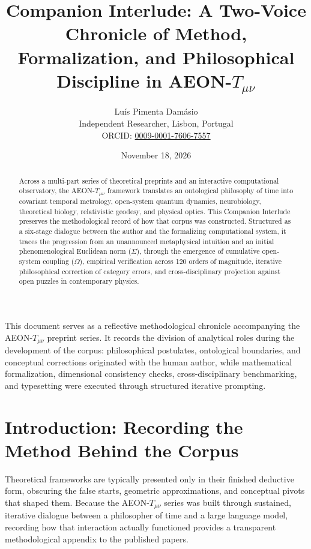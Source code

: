 \documentclass[11pt,a4paper]{article}
\title{\textbf{Companion Interlude: A Two-Voice Chronicle of Method, Formalization, and Philosophical Discipline in AEON-$T_{\mu\nu}$}}
\author{Lu\'is Pimenta Dam\'asio\\
\small Independent Researcher, Lisbon, Portugal\\
\small ORCID: \href{https://orcid.org/0009-0001-7606-7557}{0009-0001-7606-7557}}
\date{November 18, 2026}
\begin{document}
\maketitle

\begin{abstract}
Across a multi-part series of theoretical preprints and an interactive computational observatory, the AEON-$T_{\mu\nu}$ framework translates an ontological philosophy of time into covariant temporal metrology, open-system quantum dynamics, neurobiology, theoretical biology, relativistic geodesy, and physical optics. This Companion Interlude preserves the methodological record of how that corpus was constructed. Structured as a six-stage dialogue between the author and the formalizing computational system, it traces the progression from an unannounced metaphysical intuition and an initial phenomenological Euclidean norm ($\Sigma$), through the emergence of cumulative open-system coupling ($\Omega$), empirical verification across 120 orders of magnitude, iterative philosophical correction of category errors, and cross-disciplinary projection against open puzzles in contemporary physics.
\end{abstract}

\begin{tcolorbox}[colback=gray!6,colframe=gray!50,title=\textbf{Epistemic Status \& Methodological Note}]
\small
This document serves as a reflective methodological chronicle accompanying the AEON-$T_{\mu\nu}$ preprint series. It records the division of analytical roles during the development of the corpus: philosophical postulates, ontological boundaries, and conceptual corrections originated with the human author, while mathematical formalization, dimensional consistency checks, cross-disciplinary benchmarking, and typesetting were executed through structured iterative prompting.
\end{tcolorbox}

\section{Introduction: Recording the Method Behind the Corpus}

Theoretical frameworks are typically presented only in their finished deductive form, obscuring the false starts, geometric approximations, and conceptual pivots that shaped them. Because the AEON-$T_{\mu\nu}$ series was built through sustained, iterative dialogue between a philosopher of time and a large language model, recording how that interaction actually functioned provides a transparent methodological appendix to the published papers.
\end{document}
